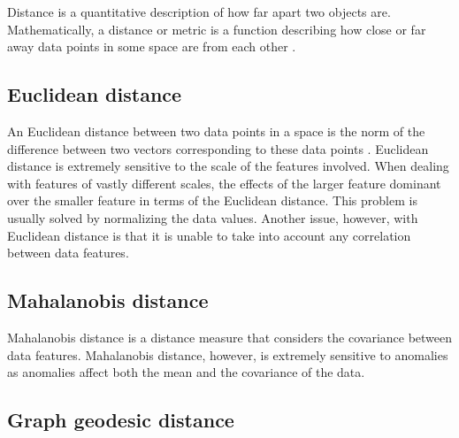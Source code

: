 Distance is a quantitative description of how far apart two objects are.
Mathematically, a distance or metric is a function describing how close or far
away data points in some space are from each other \cite{Khoa:2012}.

\subsection{Euclidean distance}
\label{sec:euclideanDistance}
An Euclidean distance between two data points in a space is the norm of the
difference between two vectors corresponding to these data points
\cite{Khoa:2012}. Euclidean distance is extremely sensitive to the scale of the
features involved. When dealing with features of vastly different scales, the
effects of the larger feature dominant over the smaller feature in terms of the
Euclidean distance. This problem is usually solved by normalizing the data
values. Another issue, however, with Euclidean distance is that it is unable to
take into account any correlation between data features.

\subsection{Mahalanobis distance}
\label{sec:mahalanobisDistance}
Mahalanobis distance is a distance measure that considers the covariance between
data features. Mahalanobis distance, however, is extremely sensitive to
anomalies as anomalies affect both the mean and the covariance of the data.

\subsection{Graph geodesic distance}
\label{sec:graphGeodesicDistance}
